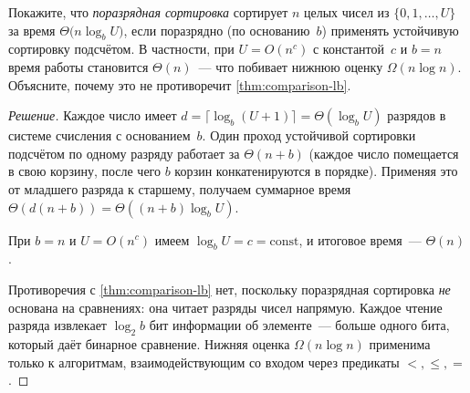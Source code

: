 \begin{problem}
\label{prob:radix-sort}
Покажите, что \emph{поразрядная сортировка} сортирует $n$ целых чисел
из $\{0, 1, \dots, U\}$ за время $\Theta\bigl(n \log_b U\bigr)$, если
поразрядно (по основанию~$b$) применять устойчивую сортировку
подсчётом. В частности, при $U = O(n^c)$ с константой~$c$ и $b = n$
время работы становится $\Theta(n)$~--- что побивает нижнюю оценку
$\Omega(n \log n)$. Объясните, почему это не противоречит
\cref{thm:comparison-lb}.
\end{problem}

\begin{proof}[Решение]
Каждое число имеет $d = \lceil \log_b(U + 1) \rceil = \Theta(\log_b U)$
разрядов в системе счисления с основанием~$b$. Один проход устойчивой
сортировки подсчётом по одному разряду работает за $\Theta(n + b)$
(каждое число помещается в свою корзину, после чего $b$ корзин
конкатенируются в порядке). Применяя это от младшего разряда к
старшему, получаем суммарное время
$\Theta(d (n + b)) = \Theta((n + b) \log_b U)$.

При $b = n$ и $U = O(n^c)$ имеем $\log_b U = c = \mathrm{const}$, и
итоговое время~--- $\Theta(n)$.

Противоречия с \cref{thm:comparison-lb} нет, поскольку поразрядная
сортировка \emph{не} основана на сравнениях: она читает разряды чисел
напрямую. Каждое чтение разряда извлекает $\log_2 b$ бит информации
об элементе~--- больше одного бита, который даёт бинарное сравнение.
Нижняя оценка $\Omega(n \log n)$ применима только к алгоритмам,
взаимодействующим со входом через предикаты $<, \le, =$.
\end{proof}
